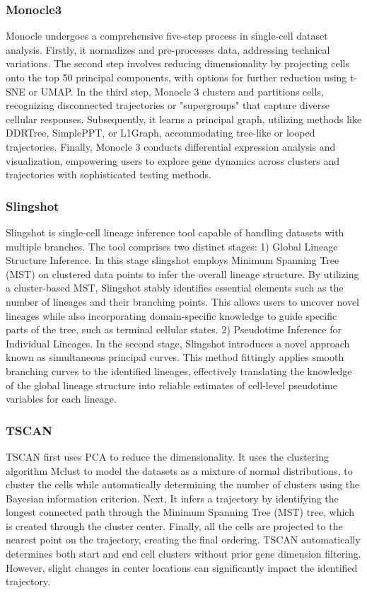 \subsubsection{Monocle3}
Monocle undergoes a comprehensive five-step process in single-cell dataset analysis. Firstly, it normalizes and pre-processes data, addressing technical variations. The second step involves reducing dimensionality by projecting cells onto the top 50 principal components, with options for further reduction using t-SNE or UMAP. In the third step, Monocle 3 clusters and partitions cells, recognizing disconnected trajectories or "supergroups" that capture diverse cellular responses. Subsequently, it learns a principal graph, utilizing methods like DDRTree, SimplePPT, or L1Graph, accommodating tree-like or looped trajectories. Finally, Monocle 3 conducts differential expression analysis and visualization, empowering users to explore gene dynamics across clusters and trajectories with sophisticated testing methods.
\subsubsection{Slingshot}
Slingshot is single-cell lineage inference tool capable of handling datasets with multiple branches. The tool comprises two distinct stages: 1) Global Lineage Structure Inference. In this stage slingshot employs Minimum Spanning Tree (MST) on clustered data points to infer the overall lineage structure. By utilizing a cluster-based MST, Slingshot stably identifies essential elements such as the number of lineages and their branching points. This allows users to uncover novel lineages while also incorporating domain-specific knowledge to guide specific parts of the tree, such as terminal cellular states. 2) Pseudotime Inference for Individual Lineages. In the second stage, Slingshot introduces a novel approach known as simultaneous principal curves. This method fittingly applies smooth branching curves to the identified lineages, effectively translating the knowledge of the global lineage structure into reliable estimates of cell-level pseudotime variables for each lineage.
\subsubsection{TSCAN}
TSCAN first uses PCA to reduce the dimensionality. It uses the clustering algorithm Mclust to model the datasets as a mixture of normal distributions, to cluster the cells while automatically determining the number of clusters using the Bayesian information criterion. Next, It infers a trajectory by identifying the longest connected path through the Minimum Spanning Tree (MST) tree, which is created through the cluster center. Finally, all the cells are projected to the nearest point on the trajectory, creating the final ordering. TSCAN automatically determines both start and end cell clusters without prior gene dimension filtering. However, slight changes in center locations can significantly impact the identified trajectory.
